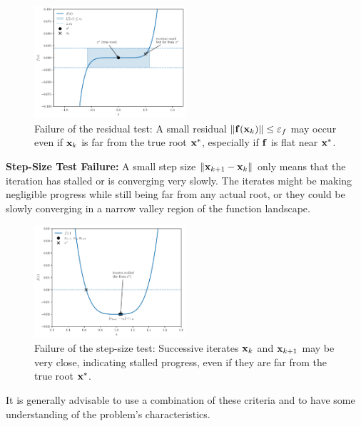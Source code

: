 \begin{figure}[h]
    \centering
    \includegraphics[width=0.5\textwidth]{figs/nle/residual_test_failure.pdf}
    \caption{Failure of the residual test: A small residual $\|\mathbf{f}(\mathbf{x}_k)\| \le \varepsilon_f$ may occur even if $\mathbf{x}_k$ is far from the true root $\mathbf{x}^*$, especially if $\mathbf{f}$ is flat near $\mathbf{x}^*$.}
\end{figure}


\textbf{Step-Size Test Failure:}
A small step size $\|\mathbf{x}_{k+1} - \mathbf{x}_k\|$ only means that the iteration has stalled or is converging very slowly. The iterates might be making negligible progress while still being far from any actual root, or they could be slowly converging in a narrow valley region of the function landscape.

\begin{figure}[H]
    \centering
    \includegraphics[width=0.5\textwidth]{figs/nle/stepsize_test_failure.pdf}
    \caption{Failure of the step-size test: Successive iterates $\mathbf{x}_k$ and $\mathbf{x}_{k+1}$ may be very close, indicating stalled progress, even if they are far from the true root $\mathbf{x}^*$.}
\end{figure}

It is generally advisable to use a combination of these criteria and to have some understanding of the problem's characteristics.

